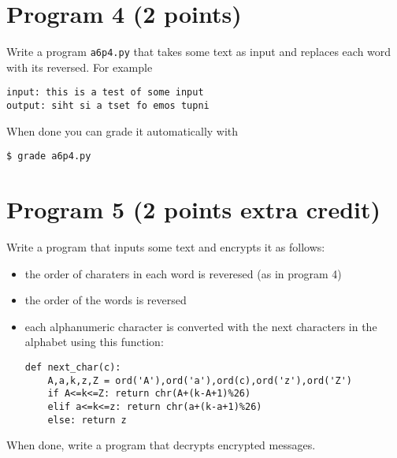 \documentclass[12pt]{article}
\begin{document}
\section{Program 4 (2 points)}

\noindent
Write a program {\tt a6p4.py} that takes some text as input and replaces each word with its reversed. For example
\begin{verbatim}
input: this is a test of some input
output: siht si a tset fo emos tupni
\end{verbatim}
\noindent When done you can grade it automatically with
\begin{verbatim}
$ grade a6p4.py
\end{verbatim}

\section{Program 5 (2 points extra credit)}
Write a program that inputs some text and encrypts it as follows:
\begin{itemize}
\item the order of charaters in each word is reveresed (as in program 4)
\item the order of the words is reversed
\item each alphanumeric character is converted with the next characters in the alphabet using this function:
\begin{verbatim}
def next_char(c):
    A,a,k,z,Z = ord('A'),ord('a'),ord(c),ord('z'),ord('Z')
    if A<=k<=Z: return chr(A+(k-A+1)%26)
    elif a<=k<=z: return chr(a+(k-a+1)%26)
    else: return z
\end{verbatim}
\end{itemize}
When done, write a program that decrypts encrypted messages.
\end{document}
